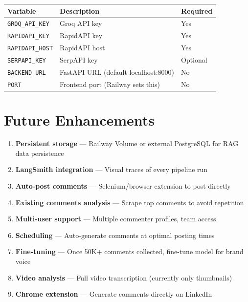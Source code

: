 \documentclass[12pt,a4paper]{article}
\begin{document}
\begin{center}
\begin{tabularx}{\textwidth}{lXl}
\toprule
\textbf{Variable} & \textbf{Description} & \textbf{Required} \\
\midrule
\texttt{GROQ\_API\_KEY} & Groq API key & Yes \\
\texttt{RAPIDAPI\_KEY} & RapidAPI key & Yes \\
\texttt{RAPIDAPI\_HOST} & RapidAPI host & Yes \\
\texttt{SERPAPI\_KEY} & SerpAPI key & Optional \\
\texttt{BACKEND\_URL} & FastAPI URL (default localhost:8000) & No \\
\texttt{PORT} & Frontend port (Railway sets this) & No \\
\bottomrule
\end{tabularx}
\end{center}

\section{Future Enhancements}

\begin{enumerate}[leftmargin=1.5em]
    \item \textbf{Persistent storage} --- Railway Volume or external PostgreSQL for RAG data persistence
    \item \textbf{LangSmith integration} --- Visual traces of every pipeline run
    \item \textbf{Auto-post comments} --- Selenium/browser extension to post directly
    \item \textbf{Existing comments analysis} --- Scrape top comments to avoid repetition
    \item \textbf{Multi-user support} --- Multiple commenter profiles, team access
    \item \textbf{Scheduling} --- Auto-generate comments at optimal posting times
    \item \textbf{Fine-tuning} --- Once 50K+ comments collected, fine-tune model for brand voice
    \item \textbf{Video analysis} --- Full video transcription (currently only thumbnails)
    \item \textbf{Chrome extension} --- Generate comments directly on LinkedIn
\end{enumerate}
\end{document}
